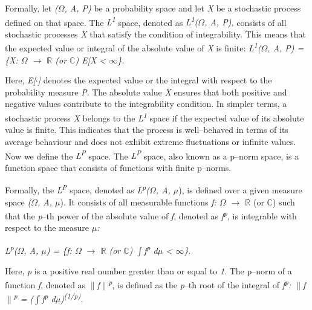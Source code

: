 \documentclass[12pt,a4paper]{report}
\numberwithin{equation}{section}
\begin{document}
Formally, let \emph{($\Omega$, A, P)} be a probability space and let \emph{X}
be a stochastic process defined on that space. The
\emph{L\textsuperscript{1}} space, denoted as
\emph{L\textsuperscript{1}($\Omega$, A, P),} consists of all stochastic
processes \emph{X} that satisfy the condition of integrability. This
means that the expected value or integral of the absolute value of
\emph{X} is finite: \emph{L\textsuperscript{1}($\Omega$, A, P) = \{X: $\Omega$ $\rightarrow$ $\mathbb{R}$ (or
$\mathbb{C}$) \textbar{} E{[}\textbar X\textbar{]} \textless{} $\infty$\}.}

Here, \emph{E{[}$\cdot${]}} denotes the expected value or the integral with
respect to the probability measure \emph{P}. The absolute value
\emph{\textbar X\textbar{}} ensures that both positive and negative
values contribute to the integrability condition. In simpler terms, a
stochastic process \emph{X} belongs to the \emph{L\textsuperscript{1}}
space if the expected value of its absolute value is finite. This
indicates that the process is well--behaved in terms of its average
behaviour and does not exhibit extreme fluctuations or infinite values.
Now we define the \emph{L\textsuperscript{P}} space. The
\emph{L\textsuperscript{P}} space, also known as a p--norm space, is a
function space that consists of functions with finite p--norms.

Formally, the \emph{L\textsuperscript{P}} space, denoted as
\emph{L\textsuperscript{p}($\Omega$, A, $\mu$}), is defined over a given measure
space \emph{($\Omega$, A, $\mu$}). It consists of all measurable functions \emph{f:
$\Omega$ $\rightarrow$ $\mathbb{R}$} (or \emph{$\mathbb{C}$}) such that the \emph{p}--th power of the absolute
value of \emph{f}, denoted as
\emph{\textbar f\textbar{}\textsuperscript{p}}, is integrable with
respect to the measure \emph{$\mu$:}

\emph{L\textsuperscript{p}($\Omega$, A, $\mu$) = \{f: $\Omega$ $\rightarrow$ $\mathbb{R}$ (or $\mathbb{C}$) \textbar{}
$\int$\textbar f\textbar{}\textsuperscript{p} d$\mu$ \textless{} $\infty$\}.}

Here, \emph{p} is a positive real number greater than or equal to
\emph{1}. The p--norm of a function \emph{f}, denoted as
\emph{$\|$f$\|$\textsuperscript{p}}, is defined as the \emph{p}--th root of the
integral of \emph{\textbar f\textbar{}\textsuperscript{p}:
$\|$f$\|$\textsuperscript{p} = ($\int$\textbar f\textbar{}\textsuperscript{p}
d$\mu$)\textsuperscript{(1/p)}.}
\end{document}

